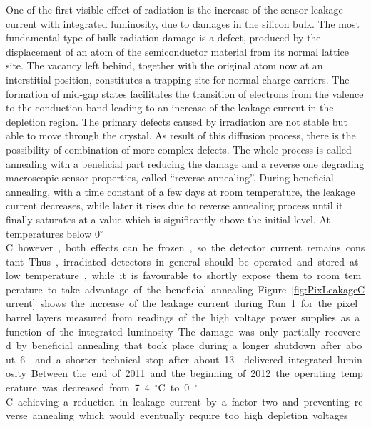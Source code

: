 One of the first visible effect of radiation is the increase of the sensor leakage current with integrated luminosity, due to damages in the silicon bulk.
The most fundamental type of bulk radiation damage is a defect, produced by the displacement of an atom of the semiconductor material from its normal lattice site.
The vacancy left behind, together with the original atom now at an interstitial position, constitutes a trapping site for normal charge carriers.
The formation of mid-gap states facilitates the transition of electrons from the valence to the conduction band leading to an increase of the leakage current in the depletion region.
The primary defects caused by irradiation are not stable but able to move through the crystal. As result of this diffusion process, there is the possibility of combination of more complex defects.
The whole process is called annealing with a beneficial part reducing the damage and a reverse one degrading macroscopic sensor properties, called ``reverse annealing''.
During beneficial annealing, with a time constant of a few days at room temperature, the leakage current decreases, while later it rises due to reverse annealing process until it finally saturates at a value which is significantly above the initial level. At temperatures below 0\unit{$^\circ$C} however, both effects can be frozen, so the detector current remains constant.
Thus, irradiated detectors in general should be operated and stored at low temperature, while it is favourable to shortly expose them to room temperature to take advantage of the beneficial annealing.

Figure~\ref{fig:PixLeakageCurrent} shows the increase of the leakage current during Run~1 for the pixel barrel layers measured from readings of the high voltage power supplies as a function of the integrated luminosity.
The damage was only partially recovered by beneficial annealing that took place during a longer shutdown after about 6\fbinv and a shorter technical stop after about 13\fbinv delivered integrated luminosity.
Between the end of 2011 and the beginning of 2012 the operating temperature was decreased from 7.4\unit{$^\circ$C} to 0\unit{$^\circ$C} achieving a reduction in leakage current by a factor two and preventing reverse annealing which would eventually require too high depletion voltages.\\

